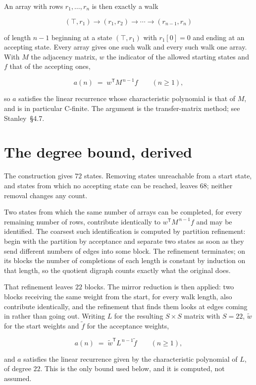 \documentclass[11pt]{article}
\theoremstyle{definition}
\begin{document}
An array with rows $r_1,\dots,r_n$ is then exactly a walk

\[(\top,r_1) \to (r_1,r_2) \to \cdots \to (r_{n-1},r_n)\]

of length $n-1$ beginning at a state $(\top,r_1)$ with $r_1[0]=0$ and ending at an accepting state. Every array gives one such walk and every such walk one array. With $M$ the adjacency matrix, $w$ the indicator of the allowed starting states and $f$ that of the accepting ones,

\[a(n) \;=\; w^{\mathsf T} M^{\,n-1} f \qquad (n \ge 1),\]

so $a$ satisfies the linear recurrence whose characteristic polynomial is that of $M$, and is in particular C-finite. The argument is the transfer-matrix method; see Stanley~\S4.7.

\section{The degree bound, derived}

The construction gives $72$ states. Removing states unreachable from a start state, and states from which no accepting state can be reached, leaves $68$; neither removal changes any count.

Two states from which the same number of arrays can be completed, for every remaining number of rows, contribute identically to $w^{\mathsf T}M^{\,n-1}f$ and may be identified. The coarsest such identification is computed by partition refinement: begin with the partition by acceptance and separate two states as soon as they send different numbers of edges into some block. The refinement terminates; on its blocks the number of completions of each length is constant by induction on that length, so the quotient digraph counts exactly what the original does.

That refinement leaves $22$ blocks. The mirror reduction is then applied: two blocks receiving the same weight from the start, for every walk length, also contribute identically, and the refinement that finds them looks at edges coming in rather than going out. Writing $L$ for the resulting $S \times S$ matrix with $S = 22$, $\tilde w$ for the start weights and $\tilde f$ for the acceptance weights,

\[a(n) \;=\; \tilde w^{\mathsf T} L^{\,n-1} \tilde f \qquad (n \ge 1),\]

and $a$ satisfies the linear recurrence given by the characteristic polynomial of $L$, of degree $22$. This is the only bound used below, and it is computed, not assumed.
\end{document}
